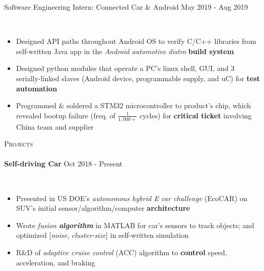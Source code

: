 \documentclass[a4paper]{article}
\newcommand{\lineunder} {
    \vspace*{-8pt} \\
    \hspace*{-18pt} \hrulefill \\
}
\newcommand{\header} [1] {
    {\hspace*{-18pt}\vspace*{6pt} \textsc{#1}}
    \vspace*{-6pt} \lineunder
}
\begin{document}
{Software Engineering Intern: Connected Car \& Android \hfill May 2019 - Aug 2019\\
\vspace{-2mm}
	\item[]
	\\
\vspace{-1mm}
\begin{itemize} \itemsep 1pt
    \item Designed API paths throughout Android OS  to verify C/C++ libraries from self-written Java app in the \textit{Android automotive distro} \textbf{build system}
    \item Designed python modules that operate a PC's linux shell, GUI, and 3 serially-linked slaves (Android device, programmable supply, and uC) for \textbf{test automation}
    		  \item Programmed \& soldered a STM32 microcontroller to product's chip, which revealed bootup failure (freq. of $\frac{1}{1,000+}$ cycles) for \textbf{critical ticket} involving China team and supplier
\end{itemize}


\header{Projects}
\vspace{1mm}
\textbf{Self-driving Car} \hfill Oct 2018 - Present\\
\vspace{-2mm}
	\item[]
	\\
\vspace{-1mm}
\begin{itemize} \itemsep 1pt
	\item Presented in US DOE's \textit{autonomous hybrid E car challenge} (EcoCAR) on SUV's initial sensor/algorithm/computer \textbf{architecture}  
    \item Wrote \textit{fusion \textbf{algorithm}} in MATLAB for car’s sensors to track objects; and optimized [\textit{noise}, \textit{cluster-size}] in self-written simulation
    \item R\&D of \textit{adaptive cruise control} (ACC) algorithm to \textbf{control} speed, acceleration, and braking
\end{itemize}

}
\end{document}
